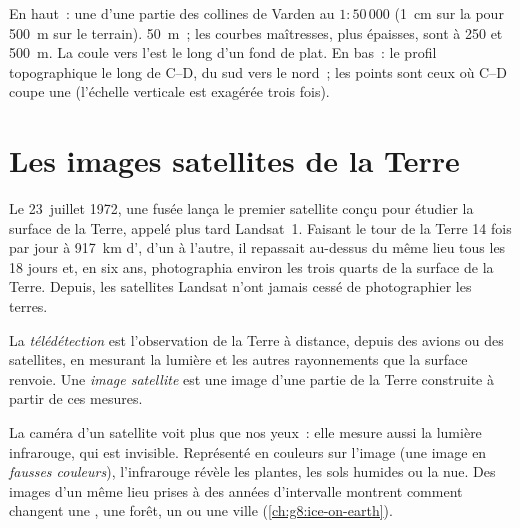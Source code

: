 \begin{omfigure}
{\small En haut~: une  d'une partie des collines de
Varden au $1 : 50\,000$ (1~cm sur la  pour \qty{500}{m} sur le
terrain).  \qty{50}{m}~; les courbes maîtresses, plus
épaisses, sont à 250 et \qty{500}{m}. La  coule vers l'est le long
d'un fond de  plat. En bas~: le profil topographique le long de
C--D, du sud vers le nord~; les points sont ceux où C--D coupe une  (l'échelle verticale est exagérée trois fois).}
\label{fig:g9:maps-of-the-earth:topo}
\end{omfigure}

\section{Les images satellites de la Terre}

Le 23~juillet 1972, une fusée lança le premier satellite conçu pour
étudier la surface de la Terre, appelé plus tard Landsat~1. Faisant le
tour de la Terre 14 fois par jour à \qty{917}{km} d', d'un  à
l'autre, il repassait au-dessus du même lieu tous les 18 jours et, en six
ans, photographia environ les trois quarts de la surface de la Terre.
Depuis, les satellites Landsat n'ont jamais cessé de photographier les
terres.

\begin{definition}\label{def:g9:maps-of-the-earth:remote-sensing}
La \emph{télédétection} est l'observation de la
Terre à distance, depuis des avions ou des satellites, en mesurant la
lumière et les autres rayonnements que la surface renvoie. Une
\emph{image satellite} est une image d'une partie de
la Terre construite à partir de ces mesures.
\end{definition}

La caméra d'un satellite voit plus que nos yeux~: elle mesure aussi la
lumière infrarouge, qui est invisible. Représenté en couleurs sur l'image
(une image en \emph{fausses couleurs}), l'infrarouge révèle les plantes,
les sols humides ou la  nue. Des images d'un même lieu prises à des
années d'intervalle montrent comment changent une , une forêt, un
 ou une ville (\cref{ch:g8:ice-on-earth}).


